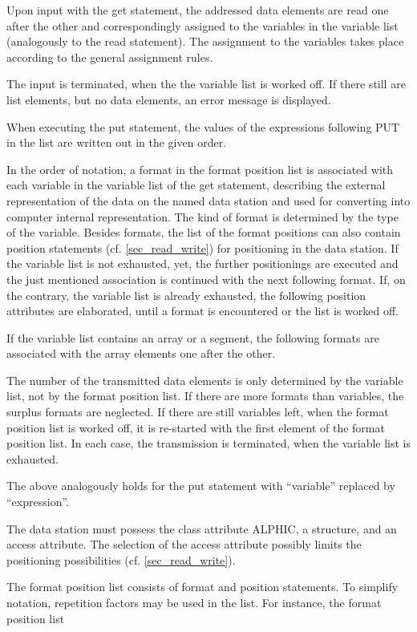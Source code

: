 Upon input with the get statement, the addressed data elements are
read one after the other and correspondingly assigned to the variables
in the variable list (analogously to the read statement). The
assignment to the variables takes place according to the general
assignment rules.

The input is terminated, when the the variable list is worked off. If
there still are list elements, but no data elements, an error message is
displayed.

When executing the put statement, the values of the expressions
following PUT in the list are written out in the given order.

In the order of notation, a format in the format position list is
associated with each variable in the variable list of the get
statement, describing the external representation of the data on the
named data station and used for converting into computer internal
representation. The kind of format is determined by the type of the
variable. Besides formats, the list of the format positions can also
contain position statements (cf. \ref{sec_read_write})
for positioning in the data
station. If the variable list is not exhausted, yet, the further
positionings are executed and the just mentioned association is
continued with the next following format. If, on the contrary, the
variable list is already exhausted, the following position attributes
are elaborated, until a format is encountered or the list is worked off.

If the variable list contains an array or a segment, the following
formats are associated with the array elements one after the other.

The number of the transmitted data elements is only determined by the
variable list, not by the format position list. If there are more
formats than variables, the surplus formats are neglected. If there are
still variables left, when the format position list is worked off, it is
re-started with the first element of the format position list. In each
case, the transmission is terminated, when the variable list is
exhausted.

The above analogously holds for the put statement with ``variable''
replaced by ``expression''.

The data station must possess the class attribute ALPHIC, a structure,
and an access attribute. The selection of the access attribute possibly
limits the positioning possibilities (cf. \ref{sec_read_write}).

The format position list consists of format and position statements.
To simplify notation, repetition factors may be used in the list. For
instance, the format position list

